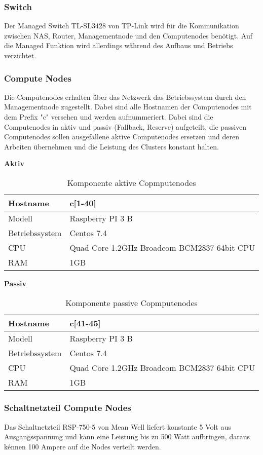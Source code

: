 \subsubsection{Switch}
Der Managed Switch TL-SL3428 von TP-Link wird für die Kommunikation zwischen NAS, Router, Managementnode und den Computenodes benötigt. Auf die Managed Funktion wird allerdings während des Aufbaus und Betriebs verzichtet.

\subsubsection{Compute Nodes}
Die Computenodes erhalten über das Netzwerk das Betriebssystem durch den Managementnode zugestellt. Dabei sind alle Hostnamen der Computenodes mit dem Prefix "c" versehen und werden aufnummeriert. Dabei sind die Computenodes in aktiv und passiv (Fallback, Reserve) aufgeteilt, die passiven Computenodes sollen ausgefallene aktive Computenodes ersetzen und deren Arbeiten übernehmen und die Leistung des Clusters konstant halten.

\textbf{Aktiv}
\begin{table}[H]
\centering
\begin{tabular}{|l|l|}
\hline
Hostname & c[1-40] \\\hline
Modell & Raspberry PI 3 B\\\hline
Betriebssystem & Centos 7.4 \\\hline
CPU & Quad Core 1.2GHz Broadcom BCM2837 64bit CPU \\\hline
RAM & 1GB  \\\hline
\end{tabular}
\caption{Komponente aktive Copmputenodes}
\end{table}

\textbf{Passiv}
\begin{table}[H]
\centering
\begin{tabular}{|l|l|}
\hline
Hostname & c[41-45] \\\hline
Modell & Raspberry PI 3 B\\\hline
Betriebssystem & Centos 7.4 \\\hline
CPU & Quad Core 1.2GHz Broadcom BCM2837 64bit CPU \\\hline
RAM & 1GB  \\\hline
\end{tabular}
\caption{Komponente passive Copmputenodes}
\end{table}

\subsubsection{Schaltnetzteil Compute Nodes}
Das Schaltnetzteil RSP-750-5 von Mean Well liefert konstante 5 Volt aus Ausgangsspannung und kann eine Leistung bis zu 500 Watt aufbringen, daraus kénnen 100 Ampere auf die Nodes verteilt werden.

